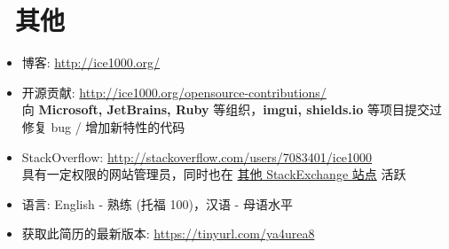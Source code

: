\documentclass{resume}
\begin{document}
\section{\faInfo\ 其他}
\begin{itemize}[parsep=0.5ex]
  \item 博客: \url{http://ice1000.org/}
  \item 开源贡献: \url{http://ice1000.org/opensource-contributions/} \\
    向 \textbf{Microsoft, JetBrains, Ruby} 等组织，\textbf{imgui, shields.io} 等项目提交过修复 bug / 增加新特性的代码
  \item StackOverflow: \url{http://stackoverflow.com/users/7083401/ice1000} \\
    具有一定权限的网站管理员，同时也在 \href{https://stackexchange.com/users/9532102/ice1000} {其他 StackExchange 站点} 活跃
  \item 语言: English - 熟练 (托福 100)，汉语 - 母语水平
  \item 获取此简历的最新版本: \url{https://tinyurl.com/ya4urea8}
\end{itemize}

%
%
\end{document}
